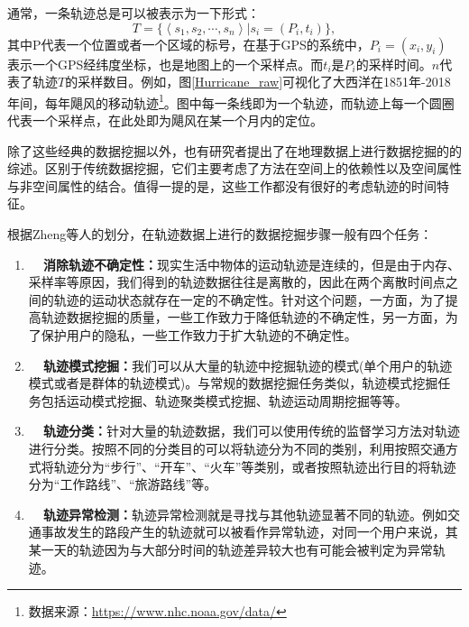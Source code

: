 通常，一条轨迹总是可以被表示为一下形式：
\begin{equation}
\label{eq:traj}
T = \{\left<s_1,s_2,\cdots,s_n\right>|s_i=(P_i,t_i)\},
\end{equation}
其中\gls{P}代表一个位置或者一个区域的标号，在基于GPS的系统中，$P_i = (x_i,y_i)$ 表示一个GPS经纬度坐标，也是地图上的一个采样点。而$t_i$是$P_i$的采样时间。$n$代表了轨迹$T$的采样数目。例如，图\ref{Hurricane_raw}可视化了大西洋在1851年-2018年间，每年飓风的移动轨迹\footnote{数据来源：\url{https://www.nhc.noaa.gov/data/}}。图中每一条线即为一个轨迹，而轨迹上每一个圆圈代表一个采样点，在此处即为飓风在某一个月内的定位。




除了这些经典的数据挖掘以外，也有研究者提出了在地理数据上进行数据挖掘的的综述。区别于传统数据挖掘，它们主要考虑了方法在空间上的依赖性以及空间属性与非空间属性的结合。值得一提的是，这些工作都没有很好的考虑轨迹的时间特征。

根据Zheng等人的划分，在轨迹数据上进行的数据挖掘步骤一般有四个任务：


\begin{enumerate}
    \item \textbf{~~消除轨迹不确定性：}现实生活中物体的运动轨迹是连续的，但是由于内存、采样率等原因，我们得到的轨迹数据往往是离散的，因此在两个离散时间点之间的轨迹的运动状态就存在一定的不确定性。针对这个问题，一方面，为了提高轨迹数据挖掘的质量，一些工作致力于降低轨迹的不确定性，另一方面，为了保护用户的隐私，一些工作致力于扩大轨迹的不确定性。
    \item \textbf{~~轨迹模式挖掘：}我们可以从大量的轨迹中挖掘轨迹的模式(单个用户的轨迹模式或者是群体的轨迹模式)。与常规的数据挖掘任务类似，轨迹模式挖掘任务包括运动模式挖掘、轨迹聚类模式挖掘、轨迹运动周期挖掘等等。
    \item \textbf{~~轨迹分类：}针对大量的轨迹数据，我们可以使用传统的监督学习方法对轨迹进行分类。按照不同的分类目的可以将轨迹分为不同的类别，利用按照交通方式将轨迹分为“步行”、“开车”、“火车”等类别，或者按照轨迹出行目的将轨迹分为“工作路线”、“旅游路线”等。
    \item \textbf{~~轨迹异常检测：}轨迹异常检测就是寻找与其他轨迹显著不同的轨迹。例如交通事故发生的路段产生的轨迹就可以被看作异常轨迹，对同一个用户来说，其某一天的轨迹因为与大部分时间的轨迹差异较大也有可能会被判定为异常轨迹。
\end{enumerate}

